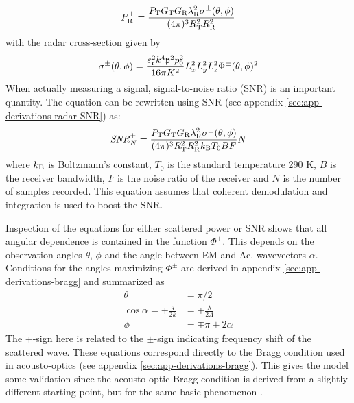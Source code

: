 \documentclass[11pt,twoside]{eitExjobb}
\begin{document}
	\begin{equation*}
		P_{\mathrm{R}}^\pm = \frac{P_{\mathrm{T}} G_{\mathrm{T}} G_{\mathrm{R}} \lambda_{\mathrm{R}}^2 \sigma^\pm (\theta,\phi)}{(4\pi)^3 R_{\mathrm{T}}^2 R_{\mathrm{R}}^2}
	\end{equation*}
	with the radar cross-section given by
	\begin{equation*}
		\sigma^\pm (\theta, \phi) = \frac{\varepsilon_{\mathrm{r}}^2 k^4 \mathfrak{p}^2 p_0^2}{16\pi K^2} L_{x}^2 L_{y}^2 L_{z}^2 \Phi^\pm (\theta,\phi)^2
	\end{equation*}
	When actually measuring a signal, signal-to-noise ratio (SNR) is an important quantity. The equation can be rewritten using SNR (see appendix \ref{sec:app-derivations-radar-SNR}) as:
	\begin{equation*}
		\mathit{SNR}^\pm_N = \frac{P_{\mathrm{T}} G_{\mathrm{T}} G_{\mathrm{R}} \lambda_{\mathrm{R}}^2 \sigma^\pm (\theta,\phi)}{(4\pi)^3 R_{\mathrm{T}}^2 R_{\mathrm{R}}^2 k_{\mathrm{B}} T_0 B F} N
	\end{equation*}
	where $k_{\mathrm{B}}$ is Boltzmann's constant, $T_0$ is the standard temperature 290 K, $B$ is the receiver bandwidth, $F$ is the noise ratio of the receiver and $N$ is the number of samples recorded. This equation assumes that coherent demodulation and integration is used to boost the SNR.
	
	Inspection of the equations for either scattered power or SNR shows that all angular dependence is contained in the function $\Phi^\pm$. This depends on the observation angles $\theta$, $\phi$ and the angle between EM and Ac. wavevectors $\alpha$. Conditions for the angles maximizing $\Phi^\pm$ are derived in appendix \ref{sec:app-derivations-bragg} and summarized as
	\begin{align}
		\theta &= \pi/2 \label{eq:an-bragg-theta} \\
		\cos{\alpha} = \mp \frac{q}{2k} &= \mp \frac{\lambda}{2\Lambda} \label{eq:an-bragg-alpha} \\
		\phi &= \mp \pi + 2\alpha \label{eq:an-bragg-phi}
	\end{align}
	The $\mp$-sign here is related to the $\pm$-sign indicating frequency shift of the scattered wave. These equations correspond directly to the Bragg condition used in acousto-optics (see appendix \ref{sec:app-derivations-bragg}). This gives the model some validation since the acousto-optic Bragg condition is derived from a slightly different starting point, but for the same basic phenomenon \cite{Saleh2007}.
	
\end{document}
